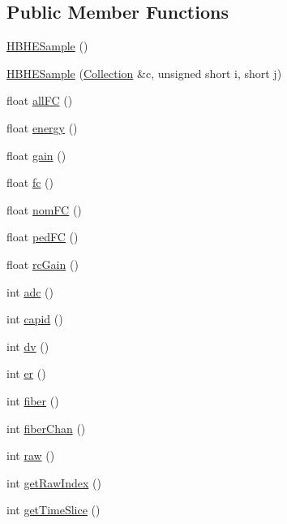 \subsection*{Public Member Functions}
\begin{DoxyCompactItemize}
\item 
\hyperlink{class_h_b_h_e_sample_adb1c7ad526bc02a95c01a82e387e3909}{H\+B\+H\+E\+Sample} ()
\item 
\hyperlink{class_h_b_h_e_sample_a04ae168af41f9b0a1588ce77b934c0e5}{H\+B\+H\+E\+Sample} (\hyperlink{class_collection}{Collection} \&c, unsigned short i, short j)
\item 
float \hyperlink{class_h_b_h_e_sample_ac674f791c79264801dbedd14c2cd88c7}{all\+F\+C} ()
\item 
float \hyperlink{class_h_b_h_e_sample_aaf6e464f53e1927e8c81c9d45bf5edd7}{energy} ()
\item 
float \hyperlink{class_h_b_h_e_sample_a213cba0c1dfac7f9c81e4bb89d1a096d}{gain} ()
\item 
float \hyperlink{class_h_b_h_e_sample_acb53267f00c5eda17d44e8e08cd97752}{fc} ()
\item 
float \hyperlink{class_h_b_h_e_sample_a1dffd426b564378da4161b5279da97b6}{nom\+F\+C} ()
\item 
float \hyperlink{class_h_b_h_e_sample_afeaa57de45b3ad755e91ba154adf9c78}{ped\+F\+C} ()
\item 
float \hyperlink{class_h_b_h_e_sample_ab03c24466f72bce782a3fcf62df15e5f}{rc\+Gain} ()
\item 
int \hyperlink{class_h_b_h_e_sample_a0519407431ebef16ff6e1df63551b99f}{adc} ()
\item 
int \hyperlink{class_h_b_h_e_sample_a8422a9d26a2ee570186192bf8bb32d13}{capid} ()
\item 
int \hyperlink{class_h_b_h_e_sample_a3baa7c7a60db7c5e01ed8d5861cb2093}{dv} ()
\item 
int \hyperlink{class_h_b_h_e_sample_a54f776ae3bda86074cc5449871588b8c}{er} ()
\item 
int \hyperlink{class_h_b_h_e_sample_a65cb719fc34ef056908006c63dc1e35f}{fiber} ()
\item 
int \hyperlink{class_h_b_h_e_sample_a87b6f6251cf487f49f98e914938cd26b}{fiber\+Chan} ()
\item 
int \hyperlink{class_h_b_h_e_sample_ac72e5201bf29d9460694bf65311ba9b7}{raw} ()
\item 
int \hyperlink{class_h_b_h_e_sample_acaa1246c5285f24db1f5317481d98e6f}{get\+Raw\+Index} ()
\item 
int \hyperlink{class_h_b_h_e_sample_a2a4edc2a272e650c7d78377d1d98db80}{get\+Time\+Slice} ()
\end{DoxyCompactItemize}
